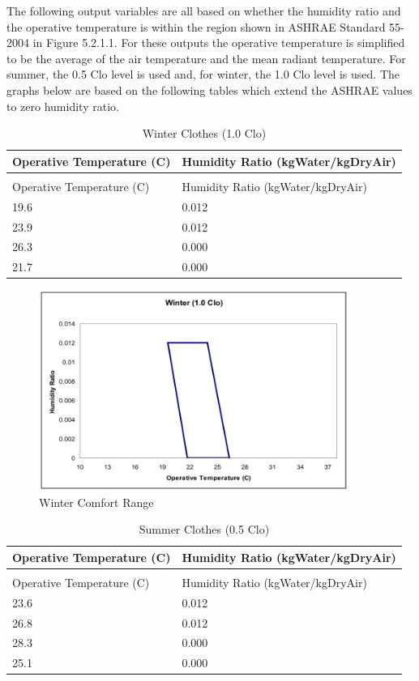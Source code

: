 The following output variables are all based on whether the humidity ratio and the operative temperature is within the region shown in ASHRAE Standard 55-2004 in Figure 5.2.1.1. For these outputs the operative temperature is simplified to be the average of the air temperature and the mean radiant temperature. For summer, the 0.5 Clo level is used and, for winter, the 1.0 Clo level is used. The graphs below are based on the following tables which extend the ASHRAE values to zero humidity ratio.

\begin{longtable}[c]{@{}ll@{}}
\caption{Winter Clothes (1.0 Clo) \label{table:winter-clothes-1.0-clo}} \tabularnewline
\toprule 
Operative Temperature (C) & Humidity Ratio (kgWater/kgDryAir) \tabularnewline
\midrule
\endfirsthead

\caption[]{Winter Clothes (1.0 Clo)} \tabularnewline
\toprule 
Operative Temperature (C) & Humidity Ratio (kgWater/kgDryAir) \tabularnewline
\midrule
\endhead

19.6 & 0.012 \tabularnewline
23.9 & 0.012 \tabularnewline
26.3 & 0.000 \tabularnewline
21.7 & 0.000 \tabularnewline
\bottomrule
\end{longtable}

\begin{figure}[hbtp] %
\centering
\includegraphics[width=0.9\textwidth, height=0.9\textheight, keepaspectratio=true]{media/image084.png}
\caption{Winter Comfort Range \protect \label{fig:winter-comfort-range}}
\end{figure}

\begin{longtable}[c]{@{}ll@{}}
\caption{Summer Clothes (0.5 Clo) \label{table:summer-clothes-0.5-clo}} \tabularnewline
\toprule 
Operative Temperature (C) & Humidity Ratio (kgWater/kgDryAir) \tabularnewline
\midrule
\endfirsthead

\caption[]{Summer Clothes (0.5 Clo)} \tabularnewline
\toprule 
Operative Temperature (C) & Humidity Ratio (kgWater/kgDryAir) \tabularnewline
\midrule
\endhead

23.6 & 0.012 \tabularnewline
26.8 & 0.012 \tabularnewline
28.3 & 0.000 \tabularnewline
25.1 & 0.000 \tabularnewline
\bottomrule
\end{longtable}


